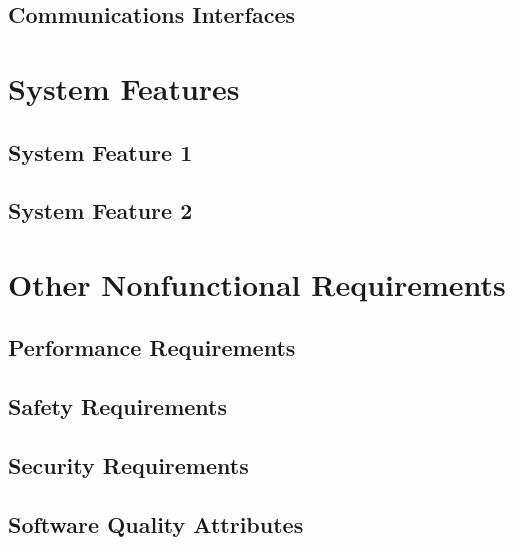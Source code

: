 \documentclass{article}
\begin{document}
\subsection{Communications Interfaces}

\newpage
\section{System Features}
\subsection{System Feature 1}

\subsection{System Feature 2}


\newpage
\section{Other Nonfunctional Requirements}
\subsection{Performance Requirements}

\subsection{Safety Requirements}

\subsection{Security Requirements}

\subsection{Software Quality Attributes}
\end{document}

